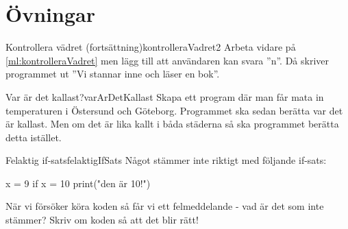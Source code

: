 \section{Övningar}

\begin{matteovning}{Kontrollera vädret (fortsättning)}{kontrolleraVadret2}
Arbeta vidare på \autoref{ml:kontrolleraVadret} men lägg till att användaren kan svara ''n''. Då skriver programmet ut ''Vi stannar inne och läser en bok''.
\end{matteovning}


\begin{matteovning}{Var är det kallast?}{varArDetKallast}
Skapa ett program där man får mata in temperaturen i Östersund och Göteborg. Programmet ska sedan berätta var det är kallast. Men om det är lika kallt i båda städerna så ska programmet berätta detta istället.
\end{matteovning}


\begin{matteovning}{Felaktig if-sats}{felaktigIfSats}
Något stämmer inte riktigt med följande if-sats:

\vspace{10pt}
\begin{python}
x = 9
if x = 10
    print("den är 10!")
\end{python}

När vi försöker köra koden så får vi ett felmeddelande - vad är det som inte stämmer? Skriv om koden så att det blir rätt!
\end{matteovning}

